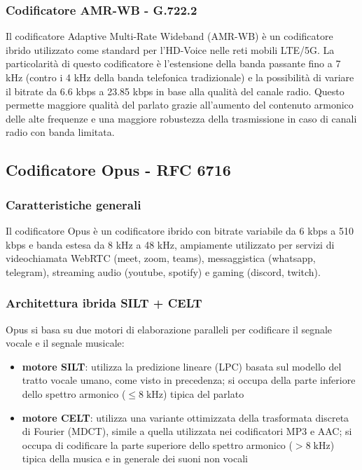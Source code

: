 \subsubsection*{Codificatore AMR-WB - G.722.2}
Il codificatore Adaptive Multi-Rate Wideband (AMR-WB) è un codificatore ibrido utilizzato come standard per l'HD-Voice
nelle reti mobili LTE/5G. La particolarità di questo codificatore è l'estensione della banda passante fino a 7 kHz (contro
i 4 kHz della banda telefonica tradizionale) e la possibilità di variare il bitrate da 6.6 kbps a 23.85 kbps in base alla
qualità del canale radio. Questo permette maggiore qualità del parlato grazie all'aumento del contenuto armonico delle alte
frequenze e una maggiore robustezza della trasmissione in caso di canali radio con banda limitata.

\newpage

\subsection{Codificatore Opus - RFC 6716}
\subsubsection*{Caratteristiche generali}
Il codificatore Opus è un codificatore ibrido con bitrate variabile da 6 kbps a 510 kbps e banda estesa da 8 kHz a 48 kHz,
ampiamente utilizzato per servizi di videochiamata WebRTC (meet, zoom, teams), messaggistica (whatsapp, telegram), streaming
audio (youtube, spotify) e gaming (discord, twitch).

\subsubsection*{Architettura ibrida SILT + CELT}
Opus si basa su due motori di elaborazione paralleli per codificare il segnale vocale e il segnale musicale:
\begin{itemize}
	\item \textbf{motore SILT}: utilizza la predizione lineare (LPC) basata sul modello del tratto vocale umano, come visto
	in precedenza; si occupa della parte inferiore dello spettro armonico (\(\leq 8 \; \text{kHz}\)) tipica del parlato
	\item \textbf{motore CELT}: utilizza una variante ottimizzata della trasformata discreta di Fourier (MDCT), simile
	a quella utilizzata nei codificatori MP3 e AAC; si occupa di codificare la parte superiore dello spettro armonico
	(\(> 8 \; \text{kHz}\)) tipica della musica e in generale dei suoni non vocali
\end{itemize}

